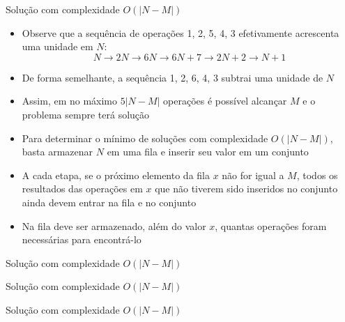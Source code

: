 \begin{frame}[fragile]{Solução com complexidade $O(|N - M|)$}

    \begin{itemize}
        \item Observe que a sequência de operações 1, 2, 5, 4, 3 efetivamente acrescenta 
            uma unidade em $N$:
            \[
                N \to 2N \to 6N \to 6N + 7 \to 2N + 2 \to N + 1
            \]

        \item De forma semelhante, a sequência 1, 2, 6, 4, 3 subtrai uma unidade de $N$

        \item Assim, em no máximo $5|N - M|$ operações é possível alcançar $M$ e o problema sempre terá
            solução

        \item Para determinar o mínimo de soluções com complexidade $O(|N - M|)$, basta armazenar
            $N$ em uma fila e inserir seu valor em um conjunto

        \item A cada etapa, se o próximo elemento da fila $x$ não for igual a $M$, todos os 
            resultados
            das operações em $x$ que não tiverem sido inseridos no conjunto ainda devem
            entrar na fila e no conjunto

        \item Na fila deve ser armazenado, além do valor $x$, quantas operações foram necessárias
            para encontrá-lo

   \end{itemize}

\end{frame}

\begin{frame}[fragile]{Solução com complexidade $O(|N - M|)$}
\end{frame}

\begin{frame}[fragile]{Solução com complexidade $O(|N - M|)$}
\end{frame}

\begin{frame}[fragile]{Solução com complexidade $O(|N - M|)$}
\end{frame}
